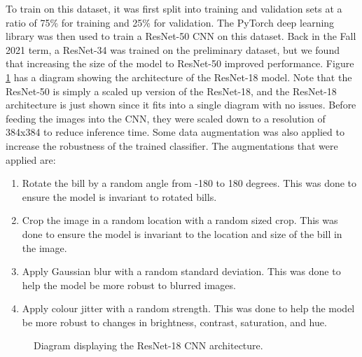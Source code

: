 \documentclass[a4paper,11pt]{article}
\begin{document}
To train on this dataset, it was first split into training and validation sets at a ratio of 75\% for training and 25\% for validation. The PyTorch deep learning library was then used to train a ResNet-50 CNN on this dataset. Back in the Fall 2021 term, a ResNet-34 was trained on the preliminary dataset, but we found that increasing the size of the model to ResNet-50 improved performance. Figure \ref{fig:resnet} has a diagram showing the architecture of the ResNet-18 model. Note that the ResNet-50 is simply a scaled up version of the ResNet-18, and the ResNet-18 architecture is just shown since it fits into a single diagram with no issues. Before feeding the images into the CNN, they were scaled down to a resolution of 384x384 to reduce inference time. Some data augmentation was also applied to increase the robustness of the trained classifier. The augmentations that were applied are:

\begin{enumerate}
    \item Rotate the bill by a random angle from -180 to 180 degrees. This was done to ensure the model is invariant to rotated bills.
    \item Crop the image in a random location with a random sized crop. This was done to ensure the model is invariant to the location and size of the bill in the image.
    \item Apply Gaussian blur with a random standard deviation. This was done to help the model be more robust to blurred images.
    \item Apply colour jitter with a random strength. This was done to help the model be more robust to changes in brightness, contrast, saturation, and hue.
\end{enumerate}

\begin{figure}[H]
\centering
{}
\caption{Diagram displaying the ResNet-18 CNN architecture. \cite{resnet}}
\label{fig:resnet}
\end{figure}
\end{document}

